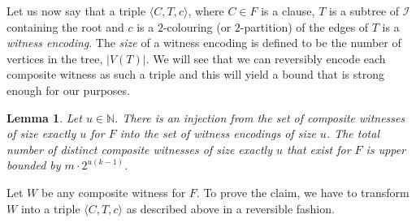 \documentclass[11pt,a4paper]{article}
\newtheorem{lemma}[theorem]{Lemma}
\begin{document}
Let us now say that a triple $\langle C, T, c \rangle$, where $C \in F$ is a clause, $T$ is a subtree of $\mathcal{I}$
containing the root and $c$ is a $2$-colouring (or $2$-partition) of the edges of $T$ is a \emph{witness encoding}. The
\emph{size} of a witness encoding is defined to be the number of vertices in the tree, $|V(T)|$.
We will see that we can reversibly encode each composite witness as such a triple and this will yield a bound that is strong
enough for our purposes.

\begin{lemma}
\label{lemencoding}
Let $u \in \mathbb{N}$.
There is an injection from the set of composite witnesses of size exactly $u$ for $F$ into the set of witness encodings of size $u$. 
The total number of distinct composite witnesses of size exactly $u$ that exist for $F$ is upper bounded
by $m \cdot 2^{u(k-1)}$.
\end{lemma}

\proof Let $W$ be any composite witness for $F$. To prove the claim, we have to transform $W$ into a triple $\langle C, T, c \rangle$
as described above in a reversible fashion. 
\end{document}
